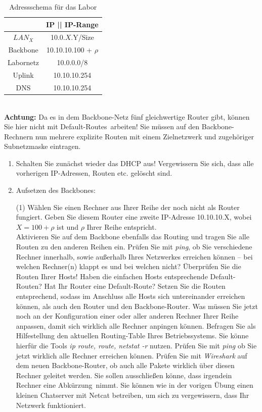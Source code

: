 \documentclass[paper=a4,fontsize=11pt]{scrartcl}%
\numberwithin{equation}{section}
\begin{document}
\begin{table}[H]
\caption{Adressschema für das Labor}
\label{adress_scheme}
\centering
\begin{tabular}{|c|c|}\hline
 & \textbf{IP  || IP-Range} \\ \hline
 $LAN_X$ & 10.0.$X$.Y/Size \\ \hline
 Backbone & 10.10.10.100 + $\rho$ \\ \hline
 Labornetz & 10.0.0.0/8 \\ \hline
 Uplink & 10.10.10.254 \\ \hline
 DNS & 10.10.10.254 \\ \hline
\end{tabular}
\end{table} 
\vskip0.05in ~\\
\textbf{Achtung:} Da es in dem Backbone-Netz fünf gleichwertige Router gibt, können Sie hier nicht mit \glqq Default-Routes\grqq\ arbeiten! Sie müssen auf den Backbone-Rechnern nun mehrere explizite Routen mit einem Zielnetzwerk und zugehöriger Subnetzmaske eintragen.
\begin{enumerate}
	\item Schalten Sie zunächst wieder das DHCP aus! Vergewissern Sie sich, dass alle vorherigen IP-Adressen, Routen etc. gelöscht sind.
	\item Aufsetzen des Backbones:

\begin{tasks}(1)
	\task Wählen Sie einen Rechner aus Ihrer Reihe der noch nicht als Router fungiert. Geben Sie diesem Router eine zweite IP-Adresse 10.10.10.X, wobei $X=100 + \rho$ ist und $\rho$ Ihrer Reihe entspricht.\\
	\task Aktivieren Sie auf dem Backbone ebenfalls das Routing und tragen Sie alle Routen zu den anderen Reihen ein.
	\task Prüfen Sie mit \emph{ping}, ob Sie verschiedene Rechner innerhalb, sowie außerhalb Ihres Netzwerkes erreichen können -- bei welchen Rechner(n) klappt es und bei welchen nicht?
	\task Überprüfen Sie die Routen Ihrer Hosts! Haben die einfachen Hosts entsprechende Default-Routen? Hat Ihr Router eine Default-Route? Setzen Sie die Routen entsprechend, sodass im Anschluss alle Hosts sich untereinander erreichen können, als auch den Router und den Backbone-Router.
	\task Was müssen Sie jetzt noch an der Konfiguration einer oder aller anderen Rechner Ihrer Reihe anpassen, damit sich wirklich alle Rechner anpingen können.
	\task Befragen Sie als Hilfestellung den aktuellen Routing-Table Ihres Betriebssystems. Sie könne hierfür die Tools \emph{ip route, route, netstat -r} nutzen.
	\task Prüfen Sie mit \emph{ping} ob Sie jetzt wirklich alle Rechner erreichen können.
	\task Prüfen Sie mit \emph{Wireshark} auf dem neuen Backbone-Router, ob auch alle Pakete wirklich über diesen Rechner geleitet werden. Sie sollen ausschließen könne, dass irgendein Rechner eine \glqq Abkürzung\grqq\ nimmt.
	\task Sie können wie in der vorigen Übung einen kleinen Chatserver mit Netcat betreiben, um sich zu vergewissern, dass Ihr Netzwerk funktioniert.
\end{tasks}
\end{enumerate}
\end{document}
